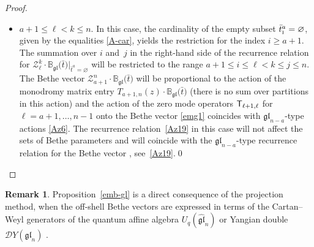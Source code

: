\documentclass[pdftex]{sigma}
\newcommand{\so}{\scriptscriptstyle \rm I}
\newcommand{\bt}{{\bar t}}
\theoremstyle{definition}
\newtheorem{rem}[thm]{Remark}
\def\r#1{\eqref{#1}}
\def\sT{{\sf T}}
\def\BBg{\mathbb{B}_{\mathfrak{gl}}}
\def\Z{\mathcal{Z}}
\begin{document}
\begin{proof}
\begin{itemize}
\item $a+1\leq \ell<k\leq n$. In this case, the cardinality of the empty subset
$\bt^a_{\so}=\varnothing$, given by the equalities
\r{A-car}, yields the restriction for the index $i\geq a+1$.
The summation over $i$ and~$j$
in the right-hand side of the recurrence relation for $\Z^k_\ell\cdot
\BBg\bigl(\bt\bigr)|_{\bt^a=\varnothing}$ will be restricted
to the range $a+1\leq i\leq \ell<k\leq j\leq n$.
The Bethe vector $\Z^n_{a+1}\cdot \BBg\bigl(\bt\bigr)$ will be proportional
to the action of the monodromy matrix entry $T_{a+1,n}(z)\cdot\BBg\bigl(\bt\bigr)$
(there is no sum over partitions in this action) and the
action of the zero mode operators $\sT_{\ell+1,\ell}$ for~${\ell=a+1,\dots,n-1}$ onto the Bethe vector \r{emg1} coincides with
$\mathfrak{gl}_{n-a}$-type actions \r{Az6}.
The recurrence relation~\r{Az19} in this case
will not affect the sets of Bethe parameters \smash{$\bigl\{\bt^s\bigr\}_1^{a-1}$} and will
coincide with the $\mathfrak{gl}_{n-a}$-type
recurrence relation for the Bethe vector \smash{$\Z^k_\ell\cdot\BBg\bigl(\bigl\{\bt^s\bigr\}_{a+1}^{n-1}\bigr)$},
see~\eqref{Az19}.\hfill \qed
\end{itemize}\renewcommand{\qed}{}
\end{proof}
\begin{rem}
Proposition~\ref{emb-gl} is a direct consequence
 of the projection method, when
 the off-shell Bethe vectors are expressed in terms of the Cartan--Weyl generators of the quantum affine algebra $U_q(\widehat{\mathfrak{gl}}_n)$ {\rm\cite{KhP-Kyoto}} or
 Yangian double $\mathcal{D}Y(\mathfrak{gl}_n)$ {\rm\cite{HLPRS17}}.\end{rem}
\end{document}
